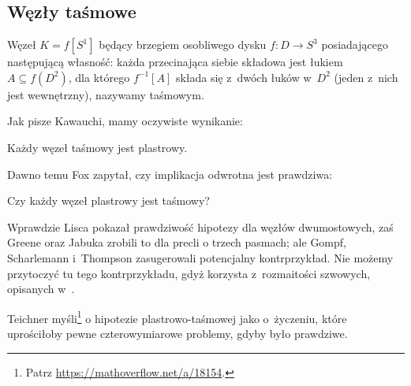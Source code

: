 
\subsection{Węzły taśmowe}
%
\begin{definition}
    Węzeł $K = f[S^1]$ będący brzegiem osobliwego dysku $f \colon D \to S^3$ posiadającego następującą własność: każda przecinająca siebie składowa jest łukiem $A \subseteq f(D^2)$, dla którego $f^{-1}[A]$ składa się z~dwóch łuków w~$D^2$ (jeden z~nich jest wewnętrzny), nazywamy taśmowym.
\end{definition}

Jak pisze Kawauchi, mamy oczywiste wynikanie:

\begin{proposition}
%
    Każdy węzeł taśmowy jest plastrowy.
\end{proposition}

Dawno temu Fox \cite[problem 1.33]{kirby1978} zapytał, czy implikacja odwrotna jest prawdziwa:
%

\begin{conjecture}
    Czy każdy węzeł plastrowy jest taśmowy?
\end{conjecture}

Wprawdzie Lisca \cite{lisca2007} pokazał prawdziwość hipotezy dla węzłów dwumostowych,
%
%
zaś Greene oraz Jabuka \cite{greene2011} zrobili to dla precli o trzech pasmach;
%
%
%
ale Gompf, Scharlemann i~Thompson \cite{gompf2010} zasugerowali potencjalny kontrprzykład.
%
%
%
%
Nie możemy przytoczyć tu tego kontrprzykładu, gdyż korzysta z~rozmaitości szwowych, opisanych w~\cite[s. 53-59]{kawauchi1996}.

Teichner myśli\footnote{Patrz \url{https://mathoverflow.net/a/18154}.} o hipotezie plastrowo-taśmowej jako o~życzeniu, które uprościłoby pewne czterowymiarowe problemy, gdyby było prawdziwe.
%



